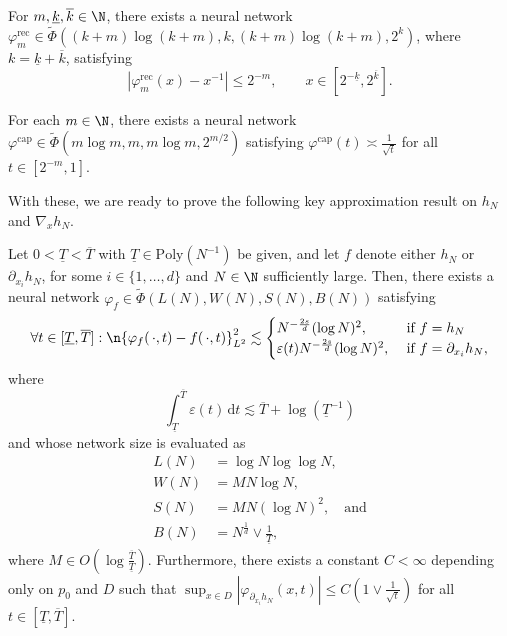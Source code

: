 \documentclass[a4paper, 11pt, headings = small, abstract]{scrartcl}
\begin{document}
\begin{lemma}
	\label{lem:rec_network_asymp}
For $m,\underline{k},\overline{k}\in\N$, there exists a neural network $\varphi_{m}^{\mathrm{rec}}\in\widetilde{\Phi}( (k+m)\log(k+m), k, (k+m)\log(k+m), 2^k)$, where $k=\underline{k}+\overline{k}$, satisfying
	\[
		|\varphi_{m}^{\mathrm{rec}}(x)-x^{-1}|
		\le2^{-m},\qquad x\in[2^{-\underline{k}}, 2^{\overline{k}}].
	\]
\end{lemma}

\begin{lemma}
    \label{lem:cap_network}
For each $m\in\N$, there exists a neural network $\varphi^{\mathrm{cap}}\in\widetilde{\Phi}(m\log m, m, m\log m, 2^{m/2})$ satisfying $\varphi^{\mathrm{cap}}(t)\asymp\frac{1}{\sqrt{t}}$ for all $t\in[2^{-m}, 1]$.
\end{lemma}

With these, we are ready to prove the following key approximation result on $h_N$ and $\nabla_xh_N$.
\begin{lemma}
	\label{lemma:approx_h_N}
Let $0<\underline{T}<\overline{T}$ with $\underline{T}\in\mathrm{Poly}(N^{-1})$ be given, and let $f$ denote either $h_N$ or $\partial_{x_i}h_N$, for some $i\in\{1, \ldots, d\}$ and $N\in\N$ sufficiently large.
Then, there exists a neural network $\varphi_{f}\in\widetilde{\Phi}(L(N), W(N), S(N), B(N))$ satisfying
	\[
		\forall t \in [\underline{T}, \overline{T}]: \n{\varphi_{f}(\,\cdot,t)-f(\,\cdot,t)}_{L^2}^2
		\lesssim \begin{cases}
			N^{-\frac{2s}{d}}(\log N)^2, &\text{ if }f=h_N\\
			\varepsilon(t)N^{-\frac{2s}{d}}(\log N)^2, &\text{ if }f=\partial_{x_i}h_N,
		\end{cases}
	\]
	where
	\[
		\int_{\underline{T}}^{\overline{T}}\varepsilon(t)\,\mathrm{d}t
		\lesssim \overline{T}+\log(\underline{T}^{-1})
	\]
	and whose network size is evaluated as 
	\begin{align*}
		L(N)
		&=\log N\log\log N, \\
		W(N)
		&=MN\log N, \\
		S(N)
		&=MN(\log N)^2,\quad\text{and} \\
		B(N)
		&=N^{\frac{1}{d}}\vee\frac{1}{\underline{T}},
	\end{align*}
	where $M\in O(\log\frac{\overline{T}}{\underline{T}})$.
        Furthermore,  there exists a constant $C<\infty$ depending only on $p_0$ and $D$ such that $\sup_{x\in D}|\varphi_{\partial_{x_i}h_N}(x, t)|\le C(1\vee\frac{1}{\sqrt{t}})$ for all $t\in[\underline{T},\overline{T}]$. 
\end{lemma}
\end{document}

